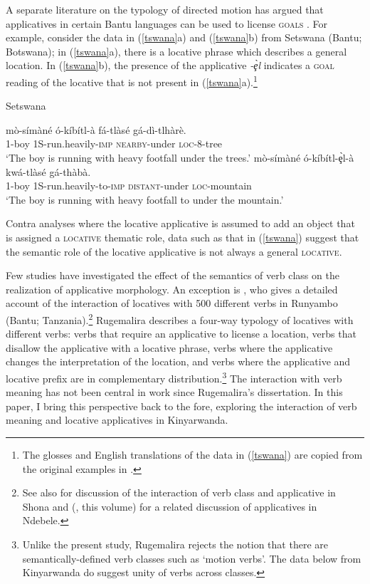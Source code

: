 \documentclass[output=paper]{langsci/langscibook}
\begin{document}
A separate literature on the typology of directed motion has argued that applicatives in certain Bantu languages can be used to license {\scshape goals} \citep{schaefer:1985,sitoe:1996}. For example, consider the data in (\ref{tswana}a) and (\ref{tswana}b) from Setswana (Bantu; Botswana); in (\ref{tswana}a), there is a locative phrase which describes a general location. In (\ref{tswana}b), the presence of the applicative \emph{-\c{è}l} indicates a {\scshape goal}  reading of the locative that is not present in (\ref{tswana}a).\footnote{The glosses and English translations of the data in (\ref{tswana}) are copied from the original examples in \citet{schaefer:1985}.}
\begin{exe}
	\ex\label{tswana}Setswana\begin{xlist}
		\ex  \gll mò-símàné ó-kíbítl-à fá-tlàsé gá-dì-tlhàrè.\\
			1-boy 1S-run.heavily-{\scshape imp} {\scshape nearby-}under {\scshape loc-8-}tree\\
			\glt `The boy is running with heavy footfall under the trees.'
		\ex\gll mò-símàné ó-kíbítl-\c{è}l-à kwá-tlàsé gá-thàbà.\\
			1-boy 1S-run.heavily-to-{\scshape imp} {\scshape distant}-under {\scshape loc-}mountain\\
			\glt `The boy is running with heavy footfall to under the mountain.'  \citep[Tables VI-VII]{schaefer:1985}
	\end{xlist}
\end{exe}
%
Contra analyses where the locative applicative is assumed to add an object that is assigned a {\scshape locative} thematic role, data such as that in (\ref{tswana}) suggest that the semantic role of the locative applicative is not always a general {\scshape locative}.

Few studies have investigated the effect of the semantics of verb class on the realization of applicative morphology. An exception is \citet{rugemalira:1993}, who gives a detailed account of the interaction of locatives with 500 different verbs in Runyambo (Bantu; Tanzania).\footnote{See also \citet{CannMabugu2007} for discussion of the interaction of verb class and applicative in Shona and \citeauthor{sibanda:2016} (\citeyear*{sibanda:2016}, this volume) for a related discussion of applicatives in Ndebele.} Rugemalira describes a four-way typology of locatives with different verbs: verbs that require an applicative to license a location, verbs that disallow the applicative with a locative phrase, verbs where the applicative changes the interpretation of the location, and verbs where the applicative and locative prefix are in complementary distribution.\footnote{Unlike the present study, Rugemalira rejects the notion that there are semantically-defined verb classes such as `motion verbs'. The data below from Kinyarwanda do suggest unity of verbs across classes.}
The interaction with verb meaning has not been central in work since Rugemalira's dissertation. In this paper, I bring this perspective back to the fore, exploring the interaction of verb meaning and locative applicatives in Kinyarwanda.
\end{document}
